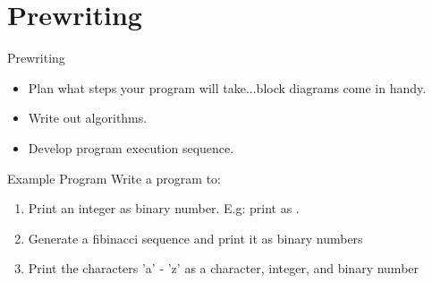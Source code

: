 \documentclass[main.tex]{subfiles}
\begin{document}
\section{Prewriting} 
\label{sec:prewriting}

\begin{frame}{Prewriting}
	\begin{itemize}
		\item Plan what steps your program will take...block diagrams come in handy.
		\item Write out algorithms.
		\item Develop program execution sequence.
	\end{itemize}
\end{frame}

\begin{frame}[fragile]{Example Program}
	Write a program to:
	\begin{enumerate}
		\item Print an integer as binary number. E.g: print  as .
		\item Generate a fibinacci sequence and print it as binary numbers
		\item Print the characters 'a' - 'z' as a character, integer, and binary number
	\end{enumerate}
\end{frame}
\end{document}
